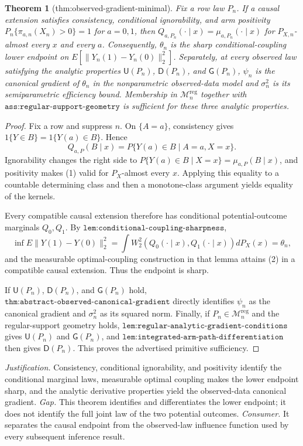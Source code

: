 \documentclass{article}
\newtheorem{theorem}{Theorem}
\begin{document}
\begin{theorem}[thm:observed-gradient-minimal]\label{thm:observed-gradient-minimal}
Fix a row law \(P_n\). If a causal extension satisfies consistency, conditional ignorability, and arm positivity \(P_n\{\pi_{a,n}(X_n)>0\}=1\) for \(a=0,1\), then \(Q_{a,P_n}(\cdot\mid x)=\mu_{a,P_n}(\cdot\mid x)\) for \(P_{X,n}\)-almost every \(x\) and every \(a\). Consequently, \(\theta_n\) is the sharp conditional-coupling lower endpoint on \(E[\|Y_n(1)-Y_n(0)\|_2^2]\). Separately, at every observed law satisfying the analytic properties \(\mathsf U(P_n)\), \(\mathsf D(P_n)\), and \(\mathsf G(P_n)\), \(\psi_n\) is the canonical gradient of \(\theta_n\) in the nonparametric observed-data model and \(\sigma_n^2\) is its semiparametric efficiency bound. Membership in \(\mathcal M_n^{\mathrm{reg}}\) together with \(\texttt{ass:regular-support-geometry}\) is sufficient for these three analytic properties.
\end{theorem}
\begin{proof}
Fix a row and suppress \(n\). On \(\{A=a\}\), consistency gives \(1\{Y\in B\}=1\{Y(a)\in B\}\). Hence
\[Q_{a,P}(B\mid x)=P\{Y(a)\in B\mid A=a,X=x\}.\tag{1}\]
Ignorability changes the right side to \(P\{Y(a)\in B\mid X=x\}=\mu_{a,P}(B\mid x)\), and positivity makes (1) valid for \(P_X\)-almost every \(x\). Applying this equality to a countable determining class and then a monotone-class argument yields equality of the kernels.

Every compatible causal extension therefore has conditional potential-outcome marginals \(Q_0,Q_1\). By \(\texttt{lem:conditional-coupling-sharpness}\),
\[\inf E\lVert Y(1)-Y(0)\rVert_2^2=\int W_2^2(Q_0(\cdot\mid x),Q_1(\cdot\mid x))dP_X(x)=\theta_n,\tag{2}\]
and the measurable optimal-coupling construction in that lemma attains (2) in a compatible causal extension. Thus the endpoint is sharp.

If \(\mathsf U(P_n)\), \(\mathsf D(P_n)\), and \(\mathsf G(P_n)\) hold, \(\texttt{thm:abstract-observed-canonical-gradient}\) directly identifies \(\psi_n\) as the canonical gradient and \(\sigma_n^2\) as its squared norm. Finally, if \(P_n\in\mathcal M_n^{\mathrm{reg}}\) and the regular-support geometry holds, \(\texttt{lem:regular-analytic-gradient-conditions}\) gives \(\mathsf U(P_n)\) and \(\mathsf G(P_n)\), and \(\texttt{lem:integrated-arm-path-differentiation}\) then gives \(\mathsf D(P_n)\). This proves the advertised primitive sufficiency.
\end{proof}
\par\smallskip\noindent \textit{Justification.} Consistency, conditional ignorability, and positivity identify the conditional marginal laws, measurable optimal coupling makes the lower endpoint sharp, and the analytic derivative properties yield the observed-data canonical gradient. \textit{Gap.} This theorem identifies and differentiates the lower endpoint; it does not identify the full joint law of the two potential outcomes. \textit{Consumer.} It separates the causal endpoint from the observed-law influence function used by every subsequent inference result.
\end{document}
